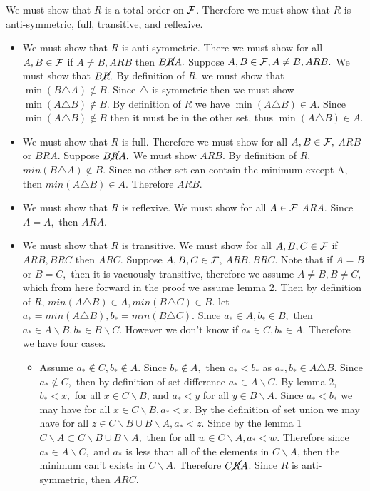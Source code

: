 \documentclass[12pt, letterpaper]{article}
\begin{document}
We must show that $R$ is a total order on $\cal F$.  Therefore we must show that $R$ is anti-symmetric, full, transitive, and reflexive.  
	\begin{itemize}
		\item We must show that $R$ is anti-symmetric.  There we must show for all $A,B \in \cal F$ if $A\neq B, ARB$ then $B \cancel{R} A.$  Suppose $A,B \in {\cal F}, A\neq B, ARB.$  We must show that $B \cancel{R}.$  By definition of $R$, we must show that $\min(B \triangle A) \not\in B.$  Since $\triangle$ is symmetric then we must show $\min(A \triangle B) \not\in B$.  By definition of $R$ we have $\min(A \triangle B) \in A$.  Since $\min(A \triangle B) \not\in B$ then it must be in the other set, thus $\min(A \triangle B) \in A.$
		\item We must show that $R$ is full.  Therefore we must show for all $A,B \in \cal F,$ $ARB$ or $BRA$.  Suppose $B\cancel{R}A.$  We must show $ARB.$  By definition of $R$, $min(B \triangle A) \not \in B.$  Since no other set can contain the minimum except A, then $min(A\triangle B) \in A.$  Therefore $ARB.$
		\item We must show that $R$ is reflexive.  We must show for all $A \in \cal F$ $ARA.$  Since $A=A,$ then $ARA.$
		\item We must show that $R$ is transitive.  We must show for all $A,B,C \in \cal F$ if $ARB, BRC$ then $ARC.$  Suppose $A,B,C \in \cal F$, $ARB, BRC$.  Note that if $A=B$ or $B=C,$ then it is vacuously transitive, therefore we assume $A\neq B, B \neq C,$ which from here forward in the proof we assume lemma 2.  Then by definition of $R$, $min(A\triangle B) \in A, min(B\triangle C) \in B.$  let $a_* = min(A\triangle B), b_* = min(B\triangle C)$.  Since $a_* \in A, b_* \in B,$ then $a_* \in A \backslash B, b_* \in B \backslash C.$  However we don't know if $a_* \in C, b_* \in A.$  Therefore we have four cases.
		\begin{itemize}
			\item Assume $a_* \not \in C, b_* \not \in A.$  Since $b_* \not \in A,$ then $a_* < b_*$ as $a_*, b_* \in A\triangle B$.  Since $a_* \not \in C,$ then by definition of set difference $a_* \in A \backslash C$.  By lemma 2, $b_* <x,$ for all $x \in C \backslash B$, and $a_* < y$ for all $y \in B \backslash A$.  Since $a_* < b_*$ we may have for all $x \in C \backslash B, a_* < x.$  By the definition of set union we may have for all $z\in C \backslash B \cup B \backslash A, a_* < z.$  Since by the lemma 1 $C \backslash A \subset C \backslash B \cup B \backslash A,$ then for all $w \in C \backslash A, a_* < w.$  Therefore since $a_* \in A \backslash C,$ and $a_*$ is less than all of the elements in $C\backslash A$, then the minimum can't exists in $C \backslash A.$  Therefore $C\cancel{R} A$.  Since $R$ is anti-symmetric, then $ARC.$

\end{itemize}
\end{itemize}
\end{document}
